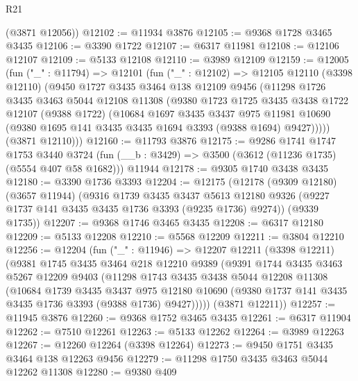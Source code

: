 \begin{lexlean}{R21}
\begin{coremodule}
      (@3871 @12056))
@12102 := @11934 @3876
@12105 := @9368 @1728 @3465 @3435
@12106 := @3390 @1722
@12107 := @6317 @11981
@12108 := @12106 @12107
@12109 := @5133 @12108
@12110 := @3989 @12109
@12159 := @12005
    (fun ("_" : @11794) =>
    @12101
      (fun ("_" : @12102) =>
      @12105
        @12110
        (@3398 @12110)
        (@9450
          @1727
          @3435
          @3464
          @138
          @12109
          @9456
          (@11298
            @1726
            @3435
            @3463
            @5044
            @12108
            @11308
            (@9380
              @1723
              @1725
              @3435
              @3438
              @1722
              @12107
              (@9388 @1722)
              (@10684
                @1697
                @3435
                @3437
                @975
                @11981
                @10690
                (@9380 @1695 @141 @3435 @3435 @1694 @3393 (@9388 @1694) @9427)))))
        (@3871 @12110)))
@12160 := @11793 @3876
@12175 := @9286
    @1741
    @1747
    @1753
    @3440
    @3724
    (fun (__b : @3429) => @3500 (@3612 (@11236 @1735) (@5554 @407 @58 @1682)))
    @11944
@12178 := @9305 @1740 @3438 @3435
@12180 := @3390 @1736 @3393
@12204 := @12175
    (@12178
      (@9309 @12180)
      (@3657 @11944)
      (@9316
        @1739
        @3435
        @3437
        @5613
        @12180
        @9326
        (@9227 @1737 @141 @3435 @3435 @1736 @3393 (@9235 @1736) @9274))
      (@9339 @1735))
@12207 := @9368 @1746 @3465 @3435
@12208 := @6317 @12180
@12209 := @5133 @12208
@12210 := @5568 @12209
@12211 := @3804 @12210
@12256 := @12204
    (fun ("_" : @11946) =>
    @12207
      @12211
      (@3398 @12211)
      (@9381
        @1745
        @3435
        @3464
        @218
        @12210
        @9389
        (@9391
          @1744
          @3435
          @3463
          @5267
          @12209
          @9403
          (@11298
            @1743
            @3435
            @3438
            @5044
            @12208
            @11308
            (@10684
              @1739
              @3435
              @3437
              @975
              @12180
              @10690
              (@9380 @1737 @141 @3435 @3435 @1736 @3393 (@9388 @1736) @9427)))))
      (@3871 @12211))
@12257 := @11945 @3876
@12260 := @9368 @1752 @3465 @3435
@12261 := @6317 @11904
@12262 := @7510 @12261
@12263 := @5133 @12262
@12264 := @3989 @12263
@12267 := @12260 @12264 (@3398 @12264)
@12273 := @9450 @1751 @3435 @3464 @138 @12263 @9456
@12279 := @11298 @1750 @3435 @3463 @5044 @12262 @11308
@12280 := @9380 @409

\end{coremodule}
\end{lexlean}
